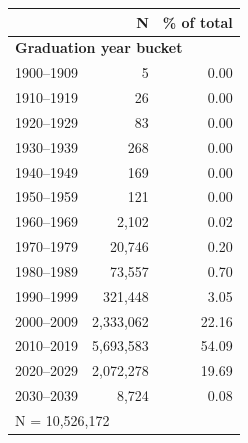 \begin{tabular}{lrr}


\toprule


 & N & \% of total \\


\midrule


\multicolumn{3}{l}{\textbf{Graduation year bucket}}\\ 
\midrule
1900–1909           &           5&        0.00\\
1910–1919           &          26&        0.00\\
1920–1929           &          83&        0.00\\
1930–1939           &         268&        0.00\\
1940–1949           &         169&        0.00\\
1950–1959           &         121&        0.00\\
1960–1969           &       2,102&        0.02\\
1970–1979           &      20,746&        0.20\\
1980–1989           &      73,557&        0.70\\
1990–1999           &     321,448&        3.05\\
2000–2009           &   2,333,062&       22.16\\
2010–2019           &   5,693,583&       54.09\\
2020–2029           &   2,072,278&       19.69\\
2030–2039           &       8,724&        0.08\\
\midrule


\multicolumn{3}{l}{\footnotesize N =   10,526,172}\\


\bottomrule


\end{tabular}



